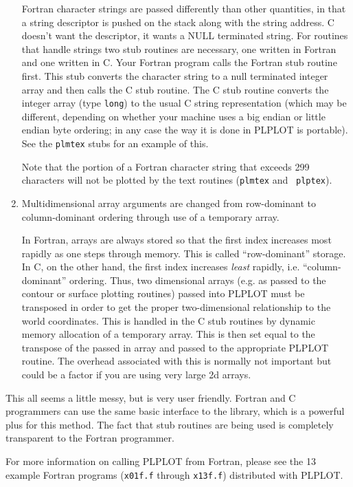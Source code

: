 \begin{enumerate}
Fortran character strings are passed differently than other quantities, in
that a string descriptor is pushed on the stack along with the string
address.  C doesn't want the descriptor, it wants a NULL terminated string.
For routines that handle strings two stub routines are necessary, one
written in Fortran and one written in C.  Your Fortran program calls the
Fortran stub routine first.  This stub converts the character string to a
null terminated integer array and then calls the C stub routine.  The C
stub routine converts the integer array (type {\tt long}) to the usual C
string representation (which may be different, depending on whether your
machine uses a big endian or little endian byte ordering; in any case the
way it is done in PLPLOT is portable).  See the {\tt plmtex} stubs for an
example of this. 

Note that the portion of a Fortran character string that exceeds 299
characters will not be plotted by the text routines ({\tt plmtex} and {\tt
plptex}). 

\item Multidimensional array arguments are changed from row-dominant to
column-dominant ordering through use of a temporary array.

In Fortran, arrays are always stored so that the first index increases most
rapidly as one steps through memory.  This is called ``row-dominant''
storage.  In C, on the other hand, the first index increases {\em least\/}
rapidly, i.e. ``column-dominant'' ordering.  Thus, two dimensional arrays
(e.g.  as passed to the contour or surface plotting routines) passed into
PLPLOT must be transposed in order to get the proper two-dimensional
relationship to the world coordinates.  This is handled in the C stub
routines by dynamic memory allocation of a temporary array.  This is then set
equal to the transpose of the passed in array and passed to the appropriate
PLPLOT routine.  The overhead associated with this is normally not important
but could be a factor if you are using very large 2d arrays.
\end{enumerate}

This all seems a little messy, but is very user friendly.  Fortran and C
programmers can use the same basic interface to the library, which is a
powerful plus for this method.  The fact that stub routines are being used
is completely transparent to the Fortran programmer.

For more information on calling PLPLOT from Fortran, please see the 13
example Fortran programs ({\tt x01f.f} through {\tt x13f.f}) distributed
with PLPLOT.

